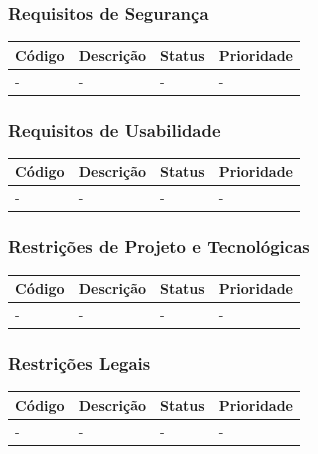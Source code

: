 \documentclass[a4paper, 12pt]{article}
\begin{document}
\subsubsection{Requisitos de Segurança}
\begin{table}[ht]
	\centering
	
	\begin{tabular}{p{2cm}p{7cm}p{2cm}p{2cm}}
		\hline
		\cellcolor{gray}Código&\cellcolor{gray}Descrição&\cellcolor{gray}Status&\cellcolor{gray}Prioridade  \\
		\hline
		-&-&-&-\\
		\hline
	\end{tabular}
\end{table}%
\subsubsection{Requisitos de Usabilidade}
\begin{table}[ht]
	\rowcolors{1}{}{}
	\centering
	
	\begin{tabular}{p{2cm}p{7cm}p{2cm}p{2cm}}
		\hline
		\cellcolor{gray}Código&\cellcolor{gray}Descrição&\cellcolor{gray}Status&\cellcolor{gray}Prioridade  \\
		\hline
		-&-&-&-\\
		\hline
	\end{tabular}
\end{table}%
\subsubsection{Restrições de Projeto e Tecnológicas}
\begin{table}[ht]
	\centering
	
	\begin{tabular}{p{2cm}p{7cm}p{2cm}p{2cm}}
		\hline
		\cellcolor{gray}Código&\cellcolor{gray}Descrição&\cellcolor{gray}Status&\cellcolor{gray}Prioridade  \\
		\hline
		-&-&-&-\\
		\hline
	\end{tabular}
\end{table}%
\newpage
\subsubsection{Restrições Legais}
\begin{table}[ht]
	\centering
	
	\begin{tabular}{p{2cm}p{7cm}p{2cm}p{2cm}}
		\hline
		\cellcolor{gray}Código&\cellcolor{gray}Descrição&\cellcolor{gray}Status&\cellcolor{gray}Prioridade  \\
		\hline
		-&-&-&-\\
		\hline
	\end{tabular}
\end{table}%
\end{document}
